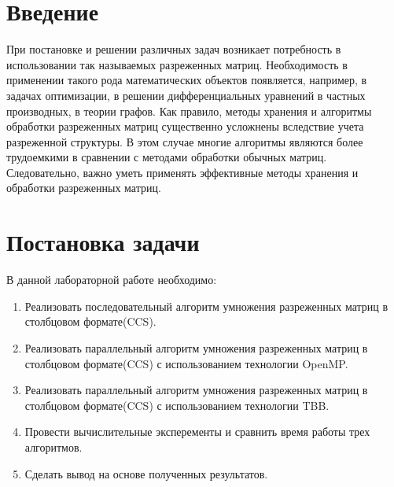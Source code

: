 \documentclass{report}
\begin{document}
\setcounter{page}{2}

\tableofcontents
\newpage

\section*{Введение}
\par При постановке и решении различных задач возникает потребность в использовании так называемых разреженных матриц. Необходимость в применении такого рода  математических объектов появляется, например, в задачах оптимизации, в решении дифференциальных уравнений в частных производных, в теории графов. Как правило, методы хранения и алгоритмы обработки разреженных матриц существенно усложнены вследствие учета разреженной структуры. В этом случае многие алгоритмы являются более трудоемкими в сравнении с методами обработки обычных матриц. Следовательно, важно уметь применять эффективные методы хранения и обработки разреженных матриц.
\newpage

\section*{Постановка задачи}
В данной лабораторной работе необходимо:
\begin{enumerate}
\item Реализовать последовательный алгоритм умножения разреженных матриц в столбцовом формате(CCS).
\item Реализовать параллельный алгоритм умножения разреженных матриц в столбцовом формате(CCS) с использованием технологии OpenMP.
\item Реализовать параллельный алгоритм умножения разреженных матриц в столбцовом формате(CCS) с использованием технологии TBB.
\item Провести вычислительные эксперементы и сравнить время работы трех алгоритмов.
\item Сделать вывод на основе полученных результатов.
\end{enumerate}
\newpage
\end{document}
